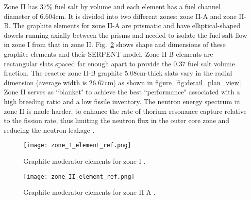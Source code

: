 Zone II has 37\% fuel salt by volume and each element has a fuel channel 
diameter of 6.604cm. It is divided into two different zones: zone II-A and zone 
II-B. The graphite elements for zone II-A are prismatic and have elliptical-shaped dowels running axially between the prisms and needed to isolate the fuel salt flow in zone I from that in zone II. Fig.~\ref{fig:II_element_ref} shows shape and dimensions of these graphite elements and their SERPENT model. Zone II-B elements are rectangular slats spaced far enough apart to provide the 0.37 fuel salt volume fraction. The reactor zone II-B graphite 5.08cm-thick slats vary in the radial dimension (average width is 26.67cm) as shown in figure~\ref{fig:detail_plan_view}. Zone II serves as ``blanket" to achieve the best ``performance" associated with a high breeding ratio and a low fissile inventory. The neutron energy spectrum in zone II is made harder, to enhance the rate of thorium resonance capture relative to the fission rate, thus limiting the neutron flux in the outer core zone and reducing the neutron leakage \cite{robertson_conceptual_1971}. 

\begin{figure}[hbp!] %
  \centering
  \vspace{-0.3em}
  \texttt{[image: zone\_I\_element\_ref.png]}
  \caption{Graphite moderator elements for zone I \cite{robertson_conceptual_1971,rykhlevskii_full-core_2017}.}
  \vspace{-0.6em}
  \label{fig:I_element_ref}
\end{figure}
\FloatBarrier

\begin{figure}[hbp!] %
  \centering
  \vspace{-0.3em}
  \texttt{[image: zone\_II\_element\_ref.png]}
  \caption{Graphite moderator elements for zone II-A \cite{robertson_conceptual_1971,rykhlevskii_full-core_2017}.}
  \vspace{-0.6em}
  \label{fig:II_element_ref}
\end{figure}
\FloatBarrier

